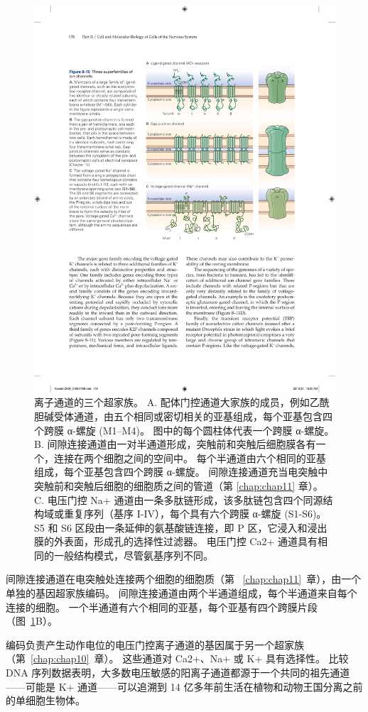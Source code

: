 \begin{figure}[htbp]
	\centering
	\includegraphics[width=0.7\linewidth]{chap08/fig_8_10}
	\caption{离子通道的三个超家族。 A. 配体门控通道大家族的成员，例如乙酰胆碱受体通道，由五个相同或密切相关的亚基组成，每个亚基包含四个跨膜 α-螺旋 (M1–M4)。 图中的每个圆柱体代表一个跨膜 α-螺旋。 B. 间隙连接通道由一对半通道形成，突触前和突触后细胞膜各有一个，连接在两个细胞之间的空间中。 每个半通道由六个相同的亚基组成，每个亚基包含四个跨膜 α-螺旋。 间隙连接通道充当电突触中突触前和突触后细胞的细胞质之间的管道（第 \ref{chap:chap11} 章）。 C. 电压门控 Na+ 通道由一条多肽链形成，该多肽链包含四个同源结构域或重复序列（基序 I-IV），每个具有六个跨膜 α-螺旋 (S1-S6)。 S5 和 S6 区段由一条延伸的氨基酸链连接，即 P 区，它浸入和浸出膜的外表面，形成孔的选择性过滤器。 电压门控 Ca2+ 通道具有相同的一般结构模式，尽管氨基序列不同。}
	\label{fig:8_10}
\end{figure}




间隙连接通道在电突触处连接两个细胞的细胞质（第 ~\ref{chap:chap11}~章），由一个单独的基因超家族编码。
间隙连接通道由两个半通道组成，每个半通道来自每个连接的细胞。
一个半通道有六个相同的亚基，每个亚基有四个跨膜片段（图~\ref{fig:8_10}B）。


编码负责产生动作电位的电压门控离子通道的基因属于另一个超家族（第~\ref{chap:chap10}~章）。
这些通道对 Ca2+、Na+ 或 K+ 具有选择性。
比较 DNA 序列数据表明，大多数电压敏感的阳离子通道都源于一个共同的祖先通道——可能是 K+ 通道——可以追溯到 14 亿多年前生活在植物和动物王国分离之前的单细胞生物体。


